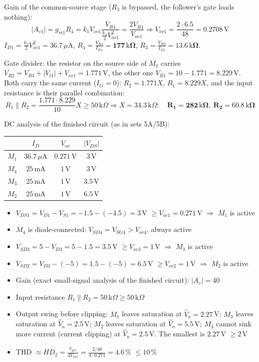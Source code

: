 \documentclass[11pt]{article}
\newcommand{\solstep}[2]{\par\medskip{\color{stepc}\textbf{Step #1 --- #2}}\par\nopagebreak}
\begin{document}
Gain of the common-source stage ($R_3$ is bypassed, the follower's gate loads nothing): \[|A_{v1}| = g_{m1}R_4 = k_1V_{ov1}\frac{V_{R4}}{\frac{k_1}{2}V_{ov1}^2} = \frac{2V_{R4}}{V_{ov1}} \Rightarrow V_{ov1} = \frac{2\cdot6.5}{48} = 0.2708\,\mathrm{V}\]$I_{D1} = \frac{k_1}{2}V_{ov1}^2 = 36.7\,\mu \mathrm{A}$, $R_4 = \frac{V_{R4}}{I_{D1}} = \mathbf{177\,\mathrm{k}\Omega}$, $R_3 = \frac{V_{R3}}{I_{D1}} = \mathbf{13.6\,\mathrm{k}\Omega}$.

Gate divider: the resistor on the source side of $M_1$ carries $V_{R2} = V_{R3} + |V_{t1}| + V_{ov1} = 1.771$\,V, the other one $V_{R1} = 10 - 1.771 = 8.229$\,V. Both carry the same current ($I_G = 0$): $R_{2} = 1.771X$, $R_{1} = 8.229X$, and the input resistance is their parallel combination: \[R_1\|R_2 = \frac{1.771\cdot8.229}{10}X \ge 50\,\mathrm{k}\Omega \Rightarrow X = 34.3\,\mathrm{k}\Omega:\quad \mathbf{R_1 = 282\,\mathrm{k}\Omega},\ \mathbf{R_2 = 60.8\,\mathrm{k}\Omega}\]
\solstep{4}{Check by analysis}DC analysis of the finished circuit (as in sets 5A/5B):\begin{center}\renewcommand{\arraystretch}{1.35}
\begin{tabular}{cccc}
\toprule
 & $I_D$ & $V_{ov}$ & $|V_{DS}|$ \\
\midrule
$M_{1}$ & $36.7\,\mu \mathrm{A}$ & $0.271$\,V & $3$\,V \\
$M_{4}$ & $25\,\mathrm{m}\mathrm{A}$ & $1$\,V & $3$\,V \\
$M_{3}$ & $25\,\mathrm{m}\mathrm{A}$ & $1$\,V & $3.5$\,V \\
$M_{2}$ & $25\,\mathrm{m}\mathrm{A}$ & $1$\,V & $6.5$\,V \\
\bottomrule
\end{tabular}\end{center}
\begin{itemize}[leftmargin=*,itemsep=2pt]
\item $V_{DS1} = V_{D1} - V_{S1} = -1.5 - (-4.5) = 3\,\mathrm{V}$ $\ge V_{ov1} = 0.271$\,V $\Rightarrow$ $M_{1}$ is active \checkmark
\item $M_{4}$ is diode-connected: $V_{SD4} = V_{SG4} > V_{ov4}$, always active \checkmark
\item $V_{SD3} = 5 - V_{D3} = 5 - 1.5 = 3.5\,\mathrm{V}$ $\ge V_{ov3} = 1$\,V $\Rightarrow$ $M_{3}$ is active \checkmark
\item $V_{SD2} = V_{D3} - (-5) = 1.5 - (-5) = 6.5\,\mathrm{V}$ $\ge V_{ov2} = 1$\,V $\Rightarrow$ $M_{2}$ is active \checkmark
\item Gain (exact small-signal analysis of the finished circuit): $|A_v| = 40$ \checkmark
\item Input resistance $R_1\|R_2 = 50\,\mathrm{k}\Omega \ge 50\,\mathrm{k}\Omega$ \checkmark
\item Output swing before clipping: $M_1$ leaves saturation at $\hat V_o = 2.27$\,V; $M_3$ leaves saturation at $\hat V_o = 2.5$\,V; $M_2$ leaves saturation at $\hat V_o = 5.5$\,V; $M_3$ cannot sink more current (current clipping) at $\hat V_o = 2.5$\,V. The smallest is $2.27$\,V $\ge 2$\,V \checkmark
\item THD $\approx HD_2 = \frac{\hat v_{gs1}}{4V_{ov1}} = \frac{2/40}{4\cdot0.271} = 4.6\,\%$ $\le 10\,\%$ \checkmark
\end{itemize}
\end{document}
